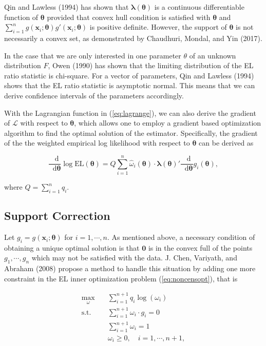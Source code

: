 \documentclass[article]{jss}
\renewcommand{\|}{\,|\,}
\begin{document}
Qin and Lawless (1994) has shown that \(\bm \lambda(\bm \theta)\) is a continuous differentiable function of \(\bm \theta\) provided that convex hull condition is satisfied with \(\bm \theta\) and \(\sum_{i=1}^n g(\bm x_i;\bm \theta)g'(\bm x_i;\bm \theta)\) is positive definite. However, the support of \(\bm \theta\) is not necessarily a convex set, as demonstrated by Chaudhuri, Mondal, and Yin (2017).

In the case that we are only interested in one parameter \(\theta\) of an unknown distribution \(F\), Owen (1990) has shown that the limiting distribution of the EL ratio statistic is chi-square. For a vector of parameters, Qin and Lawless (1994) shows that the EL ratio statistic is asymptotic normal. This means that we can derive confidence intervals of the parameters accordingly.

With the Lagrangian function in (\ref{eq:lagrange}), we can also derive the gradient of \(\mathcal{L}\) with respect to \(\bm \theta\), which allows one to employ a gradient based optimization algorithm to find the optimal solution of the estimator. Specifically, the gradient of the the weighted empirical log likelihood with respect to \(\bm \theta\) can be derived as

\begin{equation}
\frac{\mathop{}\!\mathrm{d}}{\mathop{}\!\mathrm{d}\bm \theta}\log \textrm{EL}(\bm \theta) = Q \sum_{i=1}^n \hat \omega_i(\bm \theta) \cdot \bm \lambda(\bm \theta)' \frac{\mathop{}\!\mathrm{d}}{\mathop{}\!\mathrm{d}\bm \theta}g_i(\bm \theta),
\end{equation}

where \(Q = \sum_{i=1}^n q_i\).

\hypertarget{support-correction}{%
\subsection{Support Correction}\label{support-correction}}

Let \(g_i = g(\bm x_i;\bm \theta)\) for \(i = 1,\cdots, n\). As mentioned above, a necessary condition of obtaining a unique optimal solution is that \(\bm 0\) is in the convex full of the points \(g_1,\cdots,g_n\) which may not be satisfied with the data. J. Chen, Variyath, and Abraham (2008) propose a method to handle this situation by adding one more constraint in the EL inner optimization problem (\ref{eq:noncensopt}), that is

\begin{equation} \label{eq:noncensoptadj}
\begin{split}
  \max_{\omega}\quad & \sum_{i=1}^{n+1} q_i \log(\omega_i) \\
  \text{s.t.}\quad & \sum_{i=1}^{n+1} \omega_i\cdot g_i = 0 \\
  & \sum_{i=1}^{n+1} \omega_i = 1 \\
  & \omega_i \geq 0, \quad i=1,\cdots,{n+1},
\end{split}
\end{equation}
\end{document}

